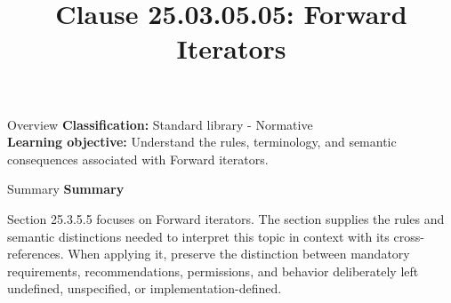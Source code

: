 \documentclass[10pt,letterpaper]{article}
\title{Clause 25.03.05.05: Forward Iterators}
\author{}
\date{}
\begin{document}
\maketitle
\begin{CornellOverviewBox}{Overview}
\textbf{Classification:} Standard library - Normative\\[2pt]
\textbf{Learning objective:} Understand the rules, terminology, and semantic consequences associated with Forward iterators.
\end{CornellOverviewBox}\begin{CornellSummaryBox}{Summary}
{\sffamily\bfseries\color{Accent} Summary}\par\vspace{3pt}Section 25.3.5.5 focuses on Forward iterators. The section supplies the rules and semantic distinctions needed to interpret this topic in context with its cross-references. When applying it, preserve the distinction between mandatory requirements, recommendations, permissions, and behavior deliberately left undefined, unspecified, or implementation-defined.
\end{CornellSummaryBox}
\end{document}
